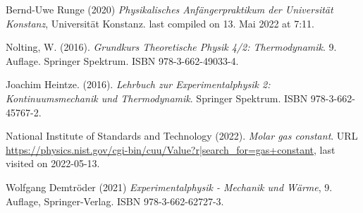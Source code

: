 \documentclass[../main.tex]{subfiles}
\begin{document}
	\begin{thebibliography}{9}
		 Bernd-Uwe Runge (2020) \emph{Physikalisches Anfängerpraktikum der Universität Konstanz}, Universität Konstanz. last compiled on 13. Mai 2022 at 7:11. 

		 Nolting, W. (2016). \emph{Grundkurs Theoretische Physik 4/2: Thermodynamik}. 9. Auflage. Springer Spektrum. ISBN 978-3-662-49033-4.
		
		 Joachim Heintze. (2016). \emph{Lehrbuch zur Experimentalphysik 2: Kontinuumsmechanik und Thermodynamik}. Springer Spektrum. ISBN 978-3-662-45767-2.

		 National Institute of Standards and Technology (2022). \emph{Molar gas constant}. URL \url{https://physics.nist.gov/cgi-bin/cuu/Value?r|search_for=gas+constant}, last visited on 2022-05-13.

		
         Wolfgang Demtröder (2021) \emph{Experimentalphysik - Mechanik und Wärme}, 9. Auflage, Springer-Verlag. ISBN 978-3-662-62727-3.
  
		
		
		
		
		

\end{thebibliography}
\end{document}
